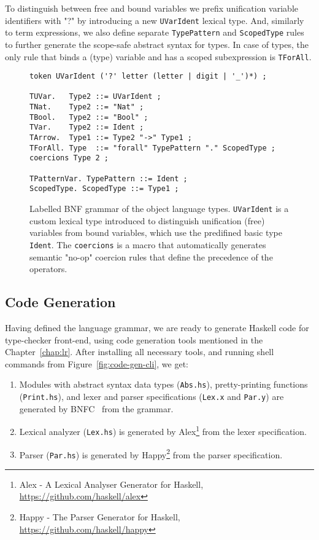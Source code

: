 To distinguish between free and bound variables we prefix unification variable identifiers with "?" by introducing a new \texttt{UVarIdent} lexical type. And, similarly to term expressions, we also define separate \texttt{TypePattern} and \texttt{ScopedType} rules to further generate the scope-safe abstract syntax for types. In case of types, the only rule that binds a (type) variable and has a scoped subexpression is \texttt{TForAll}.

\begin{figure}[H]
  \begin{verbatim}
token UVarIdent ('?' letter (letter | digit | '_')*) ;

TUVar.   Type2 ::= UVarIdent ;
TNat.    Type2 ::= "Nat" ;
TBool.   Type2 ::= "Bool" ;
TVar.    Type2 ::= Ident ;
TArrow.  Type1 ::= Type2 "->" Type1 ;
TForAll. Type  ::= "forall" TypePattern "." ScopedType ;
coercions Type 2 ;

TPatternVar. TypePattern ::= Ident ;
ScopedType. ScopedType ::= Type1 ;
  \end{verbatim}
  \caption[LBNF grammar of the object language types]{Labelled BNF grammar of the object language types. \texttt{UVarIdent} is a custom lexical type introduced to distinguish unification (free) variables from bound variables, which use the predifined basic type \texttt{Ident}. The \texttt{coercions} is a macro that automatically generates semantic "no-op" coercion rules that define the precedence of the operators.}
  \label{fig:lbnf-types}
\end{figure}


\subsection{Code Generation}

Having defined the language grammar, we are ready to generate Haskell code for type-checker front-end, using code generation tools mentioned in the Chapter~\ref{chap:lr}. After installing all necessary tools, and running shell commands from Figure~\ref{fig:code-gen-cli}, we get:

\begin{enumerate}
  \item Modules with abstract syntax data types (\texttt{Abs.hs}), pretty-printing functions (\texttt{Print.hs}), and lexer and parser specifications (\texttt{Lex.x} and \texttt{Par.y}) are generated by BNFC~\cite{BNFC} from the grammar.
  \item Lexical analyzer (\texttt{Lex.hs}) is generated by Alex\footnote{Alex - A Lexical Analyser Generator for Haskell, \url{https://github.com/haskell/alex}} from the lexer specification.
  \item Parser (\texttt{Par.hs}) is generated by Happy\footnote{Happy - The Parser Generator for Haskell, \url{https://github.com/haskell/happy}} from the parser specification.
\end{enumerate}

